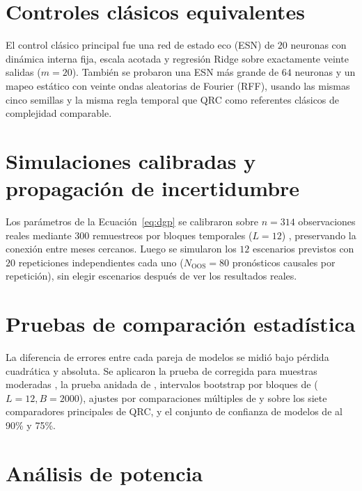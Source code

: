\section{Controles clásicos equivalentes}
\label{app:esn}

El control clásico principal fue una red de estado eco (ESN) de \(20\) neuronas con dinámica interna fija, escala acotada y regresión Ridge sobre exactamente veinte salidas (\(m=20\)). También se probaron una ESN más grande de \(64\) neuronas y un mapeo estático con veinte ondas aleatorias de Fourier (RFF), usando las mismas cinco semillas y la misma regla temporal que QRC como referentes clásicos de complejidad comparable.

\section{Simulaciones calibradas y propagación de incertidumbre}
\label{app:sintetico}

Los parámetros de la Ecuación~\ref{eq:dgp} se calibraron sobre \(n=314\) observaciones reales mediante \(300\) remuestreos por bloques temporales (\(L=12\)) \parencite{politis1992}, preservando la conexión entre meses cercanos. Luego se simularon los \(12\) escenarios previstos con \(20\) repeticiones independientes cada uno (\(N_{\text{OOS}}=80\) pronósticos causales por repetición), sin elegir escenarios después de ver los resultados reales.

\section{Pruebas de comparación estadística}
\label{app:inferencia}

La diferencia de errores entre cada pareja de modelos se midió bajo pérdida cuadrática y absoluta. Se aplicaron la prueba de \textcite{diebold1995} corregida para muestras moderadas \parencite{harvey1997}, la prueba anidada de \textcite{clark2007}, intervalos bootstrap por bloques de \textcite{politis1992} (\(L=12, B=2000\)), ajustes por comparaciones múltiples de \textcite{holm1979} y \textcite{benjamini1995} sobre los siete comparadores principales de QRC, y el conjunto de confianza de modelos de \textcite{hansen2011} al 90\% y 75\%.

\section{Análisis de potencia}
\label{app:potencia}

